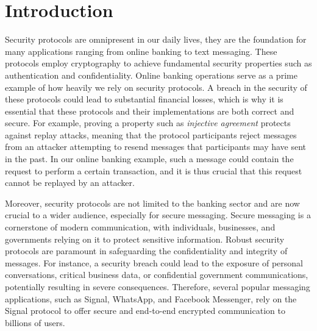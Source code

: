 \chapter{Introduction}
\label{chap:introduction}


Security protocols are omnipresent in our daily lives, they are the foundation for many applications ranging from online banking to text messaging. These protocols employ cryptography to achieve fundamental security properties such as authentication and confidentiality.
Online banking operations serve as a prime example of how heavily we rely on security protocols. A breach in the security of these protocols could lead to substantial financial losses, which is why it is essential that these protocols and their implementations are both correct and secure.
For example, proving a property such as \emph{injective agreement} protects against replay attacks, meaning that the protocol participants reject messages from an attacker attempting to resend messages that participants may have sent in the past. In our online banking example, such a message could contain the request to perform a certain transaction, and it is thus crucial that this request cannot be replayed by an attacker.

Moreover, security protocols are not limited to the banking sector and are now crucial to a wider audience, especially for secure messaging.
Secure messaging is a cornerstone of modern communication, with individuals, businesses, and governments relying on it to protect sensitive information.
Robust security protocols are paramount in safeguarding the confidentiality and integrity of messages.
For instance, a security breach could lead to the exposure of personal conversations, critical business data, or confidential government communications, potentially resulting in severe consequences.
Therefore, several popular messaging applications, such as Signal, WhatsApp, and Facebook Messenger, rely on the Signal protocol \cite{} to offer secure and end-to-end encrypted communication to billions of users.


